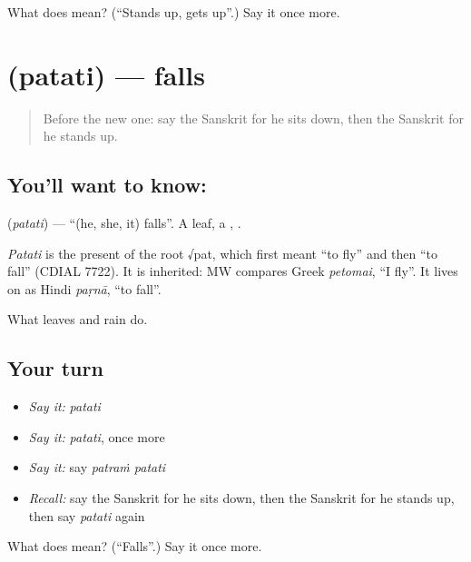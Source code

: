 \begin{tcolorbox}[breakable,colback=teal!4,colframe=teal!35!black,title={Before you move on}]
What does  mean? (\textquotedblleft{}Stands up, gets up\textquotedblright{}.) Say it once more.
\end{tcolorbox}
\section[\texorpdfstring{\sk{पतति} (patati)}{पतति (patati)}]{ (patati) — falls}

\label{lesson:SA-C71-falls}



\begin{quote}
Before the new one: say the Sanskrit for he sits down, then the Sanskrit for he stands up.
\end{quote}

\subsection*{You'll want to know: }
\textbf{} (\emph{patati}) — \textquotedblleft{}(he, she, it) falls\textquotedblright{}. A leaf, a \textbf{}, \textbf{}.

\begin{cousinweb}
\emph{Patati} is the present of the root √pat, which first meant \textquotedblleft{}to fly\textquotedblright{} and then \textquotedblleft{}to fall\textquotedblright{} (CDIAL 7722). It is inherited: MW compares Greek \emph{petomai}, \textquotedblleft{}I fly\textquotedblright{}. It lives on as Hindi \emph{paṛnā}, \textquotedblleft{}to fall\textquotedblright{}.
\end{cousinweb}

\begin{grammarlens}[title={What you've built}]
What leaves and rain do.
\end{grammarlens}

\subsection*{Your turn}
\begin{itemize}
\raggedright
  \item \emph{Say it:} \emph{patati}
  \item \emph{Say it:} \emph{patati}, once more
  \item \emph{Say it:} say \emph{patraṁ patati}
  \item \emph{Recall:} say the Sanskrit for he sits down, then the Sanskrit for he stands up, then say \emph{patati} again
\end{itemize}

\begin{tcolorbox}[breakable,colback=teal!4,colframe=teal!35!black,title={Before you move on}]
What does  mean? (\textquotedblleft{}Falls\textquotedblright{}.) Say it once more.
\end{tcolorbox}
